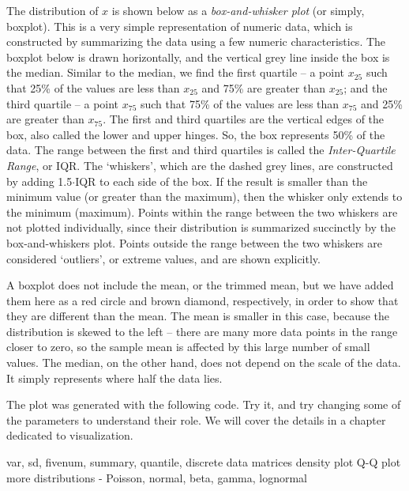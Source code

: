 The distribution of $x$ is shown below as a \textit{box-and-whisker plot} (or simply, boxplot). This is a very simple representation of numeric data, which is constructed by summarizing the data using a few numeric characteristics. The boxplot below is drawn horizontally, and the vertical grey line inside the box is the median. Similar to the median, we find the first quartile -- a point $x_{25}$ such that 25\% of the values are less than $x_{25}$ and 75\% are greater than $x_{25}$; and the third quartile -- a point $x_{75}$ such that 75\% of the values are less than $x_{75}$ and 25\% are greater than $x_{75}$. The first and third quartiles are the vertical edges of the box, also called the lower and upper hinges. So, the box represents 50\% of the data. The range between the first and third quartiles is called the \textit{Inter-Quartile Range}, or IQR.
The `whiskers', which are the dashed grey lines, are constructed by adding 1.5$\cdot$IQR to each side of the box. If the result is smaller than the minimum value (or greater than the maximum), then the whisker only extends to the minimum (maximum). Points within the range between the two whiskers are not plotted individually, since their distribution is summarized succinctly by the box-and-whiskers plot. Points outside the range between the two whiskers are considered `outliers', or extreme values, and are shown explicitly. 


A boxplot does not include the mean, or the trimmed mean, but we have added them here as a red circle and brown diamond, respectively, in order to show that they are different than the mean. The mean is smaller in this case, because the distribution is skewed to the left -- there are many more data points in the range closer to zero, so the sample mean is affected by this large number of small values. The median, on the other hand, does not depend on the scale of the data. It simply represents where half the data lies. 

The plot was generated with the following code. Try it, and try changing some of the parameters to understand their role. We will cover the details in a chapter dedicated to visualization.



var, sd, fivenum, summary, quantile, 
discrete data
matrices
density plot
Q-Q plot
more distributions - Poisson, normal, beta, gamma, lognormal
